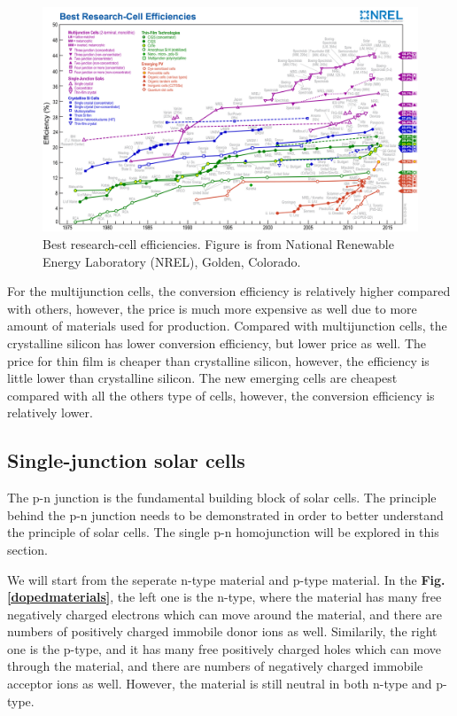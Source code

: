\documentclass[a4paper, 12pt, titlepage,oneside,drop]{kthesis}
\begin{document}
\begin{figure}[H]
\centering
\includegraphics[scale=0.3]{efficiency_chart.jpg}
\caption{Best research-cell efficiencies. Figure is from National Renewable Energy Laboratory (NREL), Golden, Colorado.}
\label{nrel}
\end{figure}

For the multijunction cells, the conversion efficiency is relatively higher compared with others, however, the price is much more expensive as well due to more amount of materials used for production.
Compared with multijunction cells, the crystalline silicon has lower conversion efficiency, but lower price as well. The price for thin film is cheaper than crystalline silicon, however,
the efficiency is little lower than crystalline silicon. The new emerging cells are cheapest compared with all the others type of cells, however, the conversion efficiency is 
relatively lower.


\subsection{Single-junction solar cells}
The p-n junction is the fundamental building block of solar cells. The principle behind the p-n junction needs to be demonstrated in order to better understand the principle of solar cells. 
The single p-n homojunction will be explored in this section.

We will start from the seperate n-type material and p-type material. In the \textbf{Fig. \ref{dopedmaterials}}, the left one is the n-type, where the material has many free negatively charged electrons which can move around the material, and there are numbers of positively 
charged immobile donor ions as well. Similarily, the right one is the p-type, and it has many free positively charged holes which can move through the material, and there are numbers of negatively charged immobile acceptor ions as well. However,
the material is still neutral in both n-type and p-type. 
\end{document}
